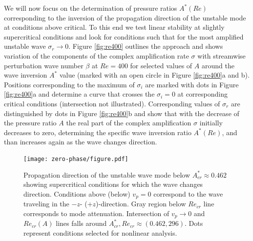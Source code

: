 \documentclass[lineno]{jfm}
\begin{document}
We will now focus on the determination of pressure ratios $A^*(Re)$ corresponding to the inversion of the propagation direction of the unstable mode at conditions above critical.
To this end we test linear stability at slightly supercritical conditions and look for conditions such that for the most amplified unstable wave $\sigma_r\to0$.
Figure \ref{fig:re400} outlines the approach and shows variation of the components of the complex amplification rate $\sigma$ with streamwise perturbation wave number $\beta$ at $Re=400$ for selected values of $A$ around the wave inversion $A^{*}$ value (marked with an open circle in Figure \ref{fig:re400}a and b).
Positions corresponding to the maximum of $\sigma_i$ are marked with dots in Figure \ref{fig:re400}a and determine a curve that crosses the $\sigma_i=0$ at corresponding critical conditions (intersection not illustrated).
Corresponding values of $\sigma_r$ are distinguished by dots in Figure \ref{fig:re400}b and show that with the decrease of the pressure ratio $A$
the real part of the complex amplification $\sigma$ initially decreases to zero, determining the specific wave inversion ratio $A^*(Re)$, and than increases again as the wave changes direction.

\begin{figure}
\centering
	\texttt{[image: zero-phase/figure.pdf]}
	\caption{ Propagation direction of the unstable wave mode below $A^*_{cr}\approx0.462$ showing supercritical conditions for which the wave changes direction. Conditions above (below) $v_p=0$ correspond to the wave traveling in the $-z$- ($+z$)-direction. Gray region below $Re_{cr}$ line corresponds to mode attenuation. Intersection of $v_p\to0$ and $Re_{cr}(A)$ lines falls around
	$A^{*}_{cr}, Re_{cr}\approx(0.462,  296)$.
	 Dots represent conditions selected for nonlinear analysis.}
	\label{fig:zero_phase}
\end{figure}
\end{document}
